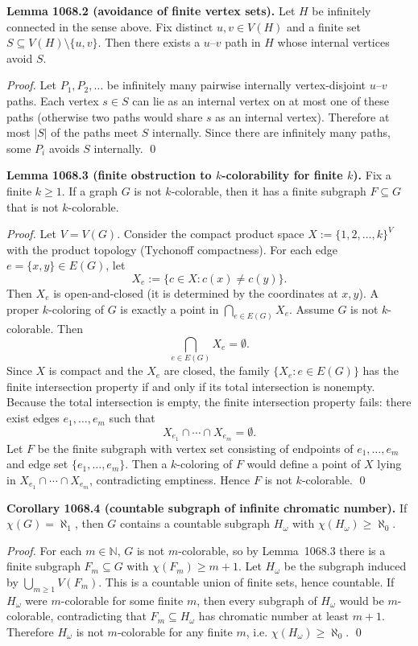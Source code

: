 \textbf{Lemma 1068.2 (avoidance of finite vertex sets).}
Let $H$ be infinitely connected in the sense above.  Fix distinct $u,v\in V(H)$ and a finite set $S\subseteq V(H)\setminus\{u,v\}$.  Then there exists a $u$--$v$ path in $H$ whose internal vertices avoid $S$.

\emph{Proof.}
Let $P_1,P_2,\ldots$ be infinitely many pairwise internally vertex-disjoint $u$--$v$ paths.  Each vertex $s\in S$ can lie as an internal vertex on at most one of these paths (otherwise two paths would share $s$ as an internal vertex). Therefore at most $|S|$ of the paths meet $S$ internally.  Since there are infinitely many paths, some $P_i$ avoids $S$ internally.
\qed

\textbf{Lemma 1068.3 (finite obstruction to $k$-colorability for finite $k$).}
Fix a finite $k\ge 1$.  If a graph $G$ is not $k$-colorable, then it has a finite subgraph $F\subseteq G$ that is not $k$-colorable.

\emph{Proof.}
Let $V=V(G)$. Consider the compact product space $X := \{1,2,\dots,k\}^V$ with the product topology (Tychonoff compactness).
For each edge $e=\{x,y\}\in E(G)$, let
\[
X_e := \{c\in X : c(x)\ne c(y)\}.
\]
Then $X_e$ is open-and-closed (it is determined by the coordinates at $x,y$).
A proper $k$-coloring of $G$ is exactly a point in $\bigcap_{e\in E(G)} X_e$.
Assume $G$ is not $k$-colorable. Then
\[
\bigcap_{e\in E(G)} X_e = \emptyset.
\]
Since $X$ is compact and the $X_e$ are closed, the family $\{X_e : e\in E(G)\}$ has the finite intersection property if and only if its total intersection is nonempty.
Because the total intersection is empty, the finite intersection property fails: there exist edges $e_1,\dots,e_m$ such that
\[
X_{e_1}\cap\cdots\cap X_{e_m} = \emptyset.
\]
Let $F$ be the finite subgraph with vertex set consisting of endpoints of $e_1,\dots,e_m$ and edge set $\{e_1,\dots,e_m\}$.  Then a $k$-coloring of $F$ would define a point of $X$ lying in $X_{e_1}\cap\cdots\cap X_{e_m}$, contradicting emptiness. Hence $F$ is not $k$-colorable.
\qed

\textbf{Corollary 1068.4 (countable subgraph of infinite chromatic number).}
If $\chi(G)=\aleph_1$, then $G$ contains a countable subgraph $H_\omega$ with $\chi(H_\omega)\ge \aleph_0$.

\emph{Proof.}
For each $m\in\mathbb{N}$, $G$ is not $m$-colorable, so by Lemma~1068.3 there is a finite subgraph $F_m\subseteq G$ with $\chi(F_m)\ge m+1$.
Let $H_\omega$ be the subgraph induced by $\bigcup_{m\ge 1} V(F_m)$.  This is a countable union of finite sets, hence countable.
If $H_\omega$ were $m$-colorable for some finite $m$, then every subgraph of $H_\omega$ would be $m$-colorable, contradicting that $F_m\subseteq H_\omega$ has chromatic number at least $m+1$.  Therefore $H_\omega$ is not $m$-colorable for any finite $m$, i.e. $\chi(H_\omega)\ge \aleph_0$.
\qed

